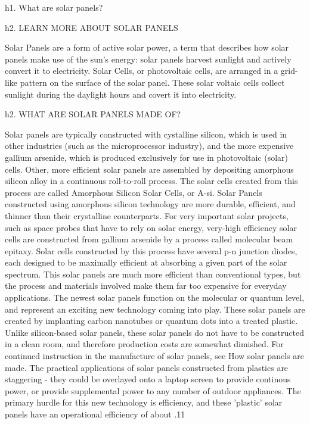 h1. What are solar panels?

h2. LEARN MORE ABOUT SOLAR PANELS

Solar Panels are a form of active solar power, a term that describes how solar panels make use of the sun's energy: solar panels harvest sunlight and actively convert it to electricity. Solar Cells, or photovoltaic cells, are arranged in a grid-like pattern on the surface of the solar panel. These solar voltaic cells collect sunlight during the daylight hours and covert it into electricity. 

h2. WHAT ARE SOLAR PANELS MADE OF?

Solar panels are typically constructed with cystalline silicon, which is used in other industries (such as the microprocessor industry), and the more expensive gallium arsenide, which is produced exclusively for use in photovoltaic (solar) cells. 
Other, more efficient solar panels are assembled by depositing amorphous silicon alloy in a continuous roll-to-roll process. The solar cells created from this process are called Amorphous Silicon Solar Cells, or A-si. Solar Panels constructed using amorphous silicon technology are more durable, efficient, and thinner than their crystalline counterparts. 
For very important solar projects, such as space probes that have to rely on solar energy, very-high efficiency solar cells are constructed from gallium arsenide by a process called molecular beam epitaxy. Solar cells constructed by this process have several p-n junction diodes, each designed to be maximally efficient at absorbing a given part of the solar spectrum. This solar panels are much more efficient than conventional types, but the process and materials involved make them far too expensive for everyday applications. 
The newest solar panels function on the molecular or quantum level, and represent an exciting new technology coming into play. These solar panels are created by implanting carbon nanotubes or quantum dots into a treated plastic. Unlike silicon-based solar panels, these solar panels do not have to be constructed in a clean room, and therefore production costs are somewhat dimished. 
For continued instruction in the manufacture of solar panels, see How solar panels are made. 
The practical applications of solar panels constructed from plastics are staggering - they could be overlayed onto a laptop screen to provide continous power, or provide supplemental power to any number of outdoor appliances. The primary hurdle for this new technology is efficiency, and these 'plastic' solar panels have an operational efficiency of about .11%

